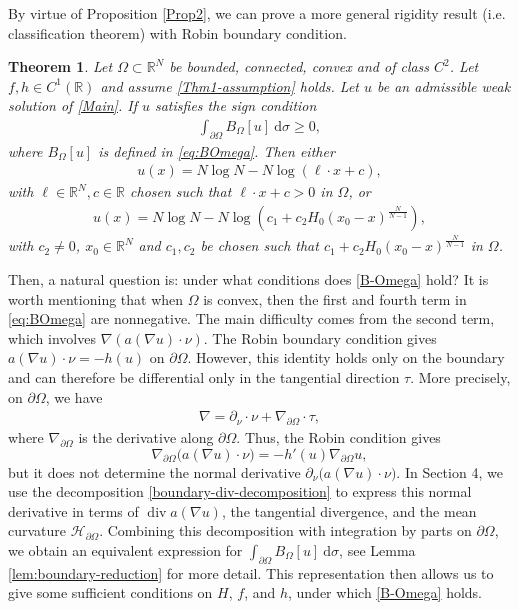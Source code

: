 \documentclass[10pt,a4paper]{amsart}
\numberwithin{equation}{section}
\newtheorem{thm}{Theorem}[section]
\newcommand{\pa}{\partial}
\newcommand{\R}{\mathbb{R}}
\begin{document}
By virtue of Proposition \ref{Prop2}, we can prove a more general rigidity result (i.e.  classification theorem) with Robin boundary condition.

\begin{thm}\label{Thm3}
    Let $\Omega\subset\R^N$ be bounded, connected, convex and of class $C^2$.  Let $f,h\in C^1(\R)$ and assume \eqref{Thm1-assumption} holds.  Let $u$ be an admissible weak solution of \eqref{Main}.  If $u$ satisfies the sign condition
    \begin{align}\label{B-Omega}
        \int_{\pa \Omega} B_{\Omega}[u] \ \text{d} \sigma \geq 0,
    \end{align}
    where $B_{\Omega}[u]$ is defined in \eqref{eq:BOmega}. Then either
    \begin{align}\label{linear-log}
        u(x) = N \log N - N \log (\ell \cdot x + c),
    \end{align}
    with $\ell \in \R^N, c \in \R$ chosen such that $\ell \cdot x + c > 0 $ in $\Omega$, or
    \begin{align}\label{bubble-log}
        u(x) = N \log N - N \log (c_1 + c_2 H_0( x_0 -x )^{\frac{N}{N-1}}),
    \end{align}
    with $c_2 \neq 0$, $x_0 \in \R^N$ and $c_1, c_2$ be chosen such that $c_1 + c_2 H_0(x_0-x)^{\frac{N}{N-1}} $ in $\Omega$.
\end{thm}

Then, a natural question is: under what conditions does
\eqref{B-Omega} hold? It is worth mentioning that when $\Omega$ is convex, then the first and fourth term in \eqref{eq:BOmega} are nonnegative. The main difficulty comes from the second term, which involves $\nabla (a(\nabla u) \cdot \nu)$. The Robin boundary condition gives $a(\nabla u) \cdot \nu = -h(u)$ on $\pa \Omega$. However, this identity holds only on the boundary and can therefore be differential only in the tangential direction $\tau$. More precisely, on $\partial\Omega$, we have
\begin{align*}
    \nabla  = \pa_{\nu} \cdot \nu+ \nabla_{\pa \Omega} \cdot \tau,
\end{align*}
where $\nabla_{\pa \Omega}$ is the derivative along $\pa \Omega$. Thus, the Robin condition gives
\[
    \nabla_{\partial\Omega} \bigl(a(\nabla u)\cdot\nu\bigr) = -h'(u)\nabla_{\partial\Omega}u,
\]
but it does not determine the normal derivative $ \partial_\nu\bigl(a(\nabla u)\cdot\nu\bigr)$. In Section 4, we use the decomposition \eqref{boundary-div-decomposition} to express this normal derivative
in terms of $\operatorname{div}a(\nabla u)$, the tangential
divergence, and the mean curvature $\mathcal H_{\partial\Omega}$. Combining this decomposition with
integration by parts on $\partial\Omega$, we obtain an equivalent expression for $\int_{\partial\Omega} B_\Omega[u]\ \text{d}\sigma$, see Lemma \ref{lem:boundary-reduction} for more detail. This representation then allows us to give some sufficient conditions on $H$, $f$, and $h$, under which \eqref{B-Omega} holds.
\end{document}
